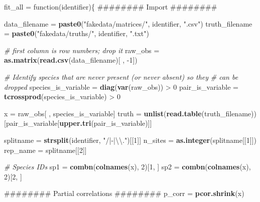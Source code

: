 \documentclass[11pt,]{article}
\newenvironment{Shaded}{\begin{snugshade}}{\end{snugshade}}
\newcommand{\KeywordTok}[1]{\textcolor[rgb]{0.13,0.29,0.53}{\textbf{{#1}}}}
\newcommand{\DecValTok}[1]{\textcolor[rgb]{0.00,0.00,0.81}{{#1}}}
\newcommand{\CharTok}[1]{\textcolor[rgb]{0.31,0.60,0.02}{{#1}}}
\newcommand{\StringTok}[1]{\textcolor[rgb]{0.31,0.60,0.02}{{#1}}}
\newcommand{\CommentTok}[1]{\textcolor[rgb]{0.56,0.35,0.01}{\textit{{#1}}}}
\newcommand{\NormalTok}[1]{{#1}}
\begin{document}
\begin{Shaded}
\begin{Highlighting}[]
\NormalTok{fit_all =}\StringTok{ }\NormalTok{function(identifier)\{}
  \NormalTok{######## Import ########}
  
  \NormalTok{data_filename =}\StringTok{ }\KeywordTok{paste0}\NormalTok{(}\StringTok{"fakedata/matrices/"}\NormalTok{, identifier, }\StringTok{".csv"}\NormalTok{)}
  \NormalTok{truth_filename =}\StringTok{ }\KeywordTok{paste0}\NormalTok{(}\StringTok{"fakedata/truths/"}\NormalTok{, identifier, }\StringTok{".txt"}\NormalTok{)}
  
  \CommentTok{# first column is row numbers; drop it}
  \NormalTok{raw_obs =}\StringTok{ }\KeywordTok{as.matrix}\NormalTok{(}\KeywordTok{read.csv}\NormalTok{(data_filename)[ , -}\DecValTok{1}\NormalTok{])}
  
  \CommentTok{# Identify species that are never present (or never absent) so they }
  \CommentTok{# can be dropped}
  \NormalTok{species_is_variable =}\StringTok{ }\KeywordTok{diag}\NormalTok{(}\KeywordTok{var}\NormalTok{(raw_obs)) >}\StringTok{ }\DecValTok{0}
  \NormalTok{pair_is_variable =}\StringTok{ }\KeywordTok{tcrossprod}\NormalTok{(species_is_variable) >}\StringTok{ }\DecValTok{0}
  
  \NormalTok{x =}\StringTok{ }\NormalTok{raw_obs[ , species_is_variable]}
  \NormalTok{truth =}\StringTok{ }\KeywordTok{unlist}\NormalTok{(}\KeywordTok{read.table}\NormalTok{(truth_filename))[pair_is_variable[}\KeywordTok{upper.tri}\NormalTok{(pair_is_variable)]]}
  
  \NormalTok{splitname =}\StringTok{ }\KeywordTok{strsplit}\NormalTok{(identifier, }\StringTok{"/|-|}\CharTok{\textbackslash{}\textbackslash{}}\StringTok{."}\NormalTok{)[[}\DecValTok{1}\NormalTok{]]}
  \NormalTok{n_sites =}\StringTok{ }\KeywordTok{as.integer}\NormalTok{(splitname[[}\DecValTok{1}\NormalTok{]])}
  \NormalTok{rep_name =}\StringTok{ }\NormalTok{splitname[[}\DecValTok{2}\NormalTok{]]}
  
  \CommentTok{# Species IDs}
  \NormalTok{sp1 =}\StringTok{ }\KeywordTok{combn}\NormalTok{(}\KeywordTok{colnames}\NormalTok{(x), }\DecValTok{2}\NormalTok{)[}\DecValTok{1}\NormalTok{, ]}
  \NormalTok{sp2 =}\StringTok{ }\KeywordTok{combn}\NormalTok{(}\KeywordTok{colnames}\NormalTok{(x), }\DecValTok{2}\NormalTok{)[}\DecValTok{2}\NormalTok{, ]}
  
  \NormalTok{######## Partial correlations ########}
  \NormalTok{p_corr =}\StringTok{ }\KeywordTok{pcor.shrink}\NormalTok{(x)}
  

\end{Highlighting}
\end{Shaded}
\end{document}
